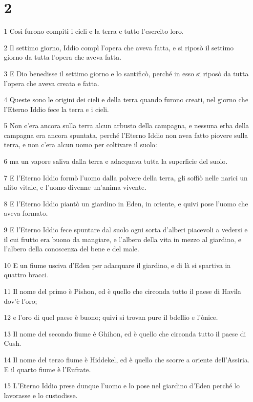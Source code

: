 \chapter{2}

\par 1 Così furono compiti i cieli e la terra e tutto l'esercito loro.
\par 2 Il settimo giorno, Iddio compì l'opera che aveva fatta, e si riposò il settimo giorno da tutta l'opera che aveva fatta.
\par 3 E Dio benedisse il settimo giorno e lo santificò, perché in esso si riposò da tutta l'opera che aveva creata e fatta.
\par 4 Queste sono le origini dei cieli e della terra quando furono creati, nel giorno che l'Eterno Iddio fece la terra e i cieli.
\par 5 Non c'era ancora sulla terra alcun arbusto della campagna, e nessuna erba della campagna era ancora spuntata, perché l'Eterno Iddio non avea fatto piovere sulla terra, e non c'era alcun uomo per coltivare il suolo:
\par 6 ma un vapore saliva dalla terra e adacquava tutta la superficie del suolo.
\par 7 E l'Eterno Iddio formò l'uomo dalla polvere della terra, gli soffiò nelle narici un alito vitale, e l'uomo divenne un'anima vivente.
\par 8 E l'Eterno Iddio piantò un giardino in Eden, in oriente, e quivi pose l'uomo che aveva formato.
\par 9 E l'Eterno Iddio fece spuntare dal suolo ogni sorta d'alberi piacevoli a vedersi e il cui frutto era buono da mangiare, e l'albero della vita in mezzo al giardino, e l'albero della conoscenza del bene e del male.
\par 10 E un fiume usciva d'Eden per adacquare il giardino, e di là si spartiva in quattro bracci.
\par 11 Il nome del primo è Pishon, ed è quello che circonda tutto il paese di Havila dov'è l'oro;
\par 12 e l'oro di quel paese è buono; quivi si trovan pure il bdellio e l'ònice.
\par 13 Il nome del secondo fiume è Ghihon, ed è quello che circonda tutto il paese di Cush.
\par 14 Il nome del terzo fiume è Hiddekel, ed è quello che scorre a oriente dell'Assiria. E il quarto fiume è l'Eufrate.
\par 15 L'Eterno Iddio prese dunque l'uomo e lo pose nel giardino d'Eden perché lo lavorasse e lo custodisse.
